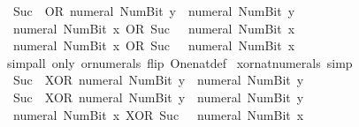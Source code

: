 \begin{isabellebody}
\ \ {\isacartoucheopen}Suc\ {}\ OR\ numeral\ {\isacharparenleft}{\kern0pt}Num{\isachardot}{\kern0pt}Bit{}\ y{\isacharparenright}{\kern0pt}\ {\isacharequal}{\kern0pt}\ numeral\ {\isacharparenleft}{\kern0pt}Num{\isachardot}{\kern0pt}Bit{}\ y{\isacharparenright}{\kern0pt}{\isacartoucheclose}\isanewline
\ \ {\isacartoucheopen}numeral\ {\isacharparenleft}{\kern0pt}Num{\isachardot}{\kern0pt}Bit{}\ x{\isacharparenright}{\kern0pt}\ OR\ Suc\ {}\ {\isacharequal}{\kern0pt}\ numeral\ {\isacharparenleft}{\kern0pt}Num{\isachardot}{\kern0pt}Bit{}\ x{\isacharparenright}{\kern0pt}{\isacartoucheclose}\isanewline
\ \ {\isacartoucheopen}numeral\ {\isacharparenleft}{\kern0pt}Num{\isachardot}{\kern0pt}Bit{}\ x{\isacharparenright}{\kern0pt}\ OR\ Suc\ {}\ {\isacharequal}{\kern0pt}\ numeral\ {\isacharparenleft}{\kern0pt}Num{\isachardot}{\kern0pt}Bit{}\ x{\isacharparenright}{\kern0pt}{\isacartoucheclose}\isanewline
%
\isadelimproof
\ \ %
\endisadelimproof
%
\isatagproof
{}\isamarkupfalse%
\ {\isacharparenleft}{\kern0pt}simp{\isacharunderscore}{\kern0pt}all\ only{\isacharcolon}{\kern0pt}\ or{\isacharunderscore}{\kern0pt}numerals\ flip{\isacharcolon}{\kern0pt}\ One{\isacharunderscore}{\kern0pt}nat{\isacharunderscore}{\kern0pt}def{\isacharparenright}{\kern0pt}%
\endisatagproof
{\isafoldproof}%
%
\isadelimproof
\isanewline
%
\endisadelimproof
\isanewline
{}\isamarkupfalse%
\ xor{\isacharunderscore}{\kern0pt}nat{\isacharunderscore}{\kern0pt}numerals\ {\isacharbrackleft}{\kern0pt}simp{\isacharbrackright}{\kern0pt}{\isacharcolon}{\kern0pt}\isanewline
\ \ {\isacartoucheopen}Suc\ {}\ XOR\ numeral\ {\isacharparenleft}{\kern0pt}Num{\isachardot}{\kern0pt}Bit{}\ y{\isacharparenright}{\kern0pt}\ {\isacharequal}{\kern0pt}\ numeral\ {\isacharparenleft}{\kern0pt}Num{\isachardot}{\kern0pt}Bit{}\ y{\isacharparenright}{\kern0pt}{\isacartoucheclose}\isanewline
\ \ {\isacartoucheopen}Suc\ {}\ XOR\ numeral\ {\isacharparenleft}{\kern0pt}Num{\isachardot}{\kern0pt}Bit{}\ y{\isacharparenright}{\kern0pt}\ {\isacharequal}{\kern0pt}\ numeral\ {\isacharparenleft}{\kern0pt}Num{\isachardot}{\kern0pt}Bit{}\ y{\isacharparenright}{\kern0pt}{\isacartoucheclose}\isanewline
\ \ {\isacartoucheopen}numeral\ {\isacharparenleft}{\kern0pt}Num{\isachardot}{\kern0pt}Bit{}\ x{\isacharparenright}{\kern0pt}\ XOR\ Suc\ {}\ {\isacharequal}{\kern0pt}\ numeral\ {\isacharparenleft}{\kern0pt}Num{\isachardot}{\kern0pt}Bit{}\ x{\isacharparenright}{\kern0pt}{\isacartoucheclose}\isanewline

\end{isabellebody}
